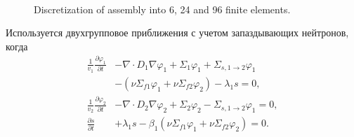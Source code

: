 \documentclass[authoryear]{elsarticle}
\begin{document}
\begin{figure}[!h]
\begin{center}
\begin{minipage}{0.30\linewidth}
\end{minipage}
\hfill
\begin{minipage}{0.30\linewidth}
\\
\end{minipage}
\caption{Discretization of assembly into 6, 24 and 96 finite elements.}
\label{fig:3}
  \end{center}
\end{figure}

Используется двухгрупповое приближения с учетом запаздывающих нейтронов, когда 
\begin{equation}\label{22}
\begin{split}
 \frac{1}{v_1}  \frac{\partial \varphi_1}{\partial t}  
 & - \nabla \cdot D_1 \nabla \varphi_1  + \Sigma_1 \varphi_1 + \Sigma_{s,1\rightarrow 2} \varphi_1  \\
 & - (\nu \Sigma_{f1} \varphi_1 + \nu \Sigma_{f2} \varphi_2) - \lambda_1 s = 0, \\
 \frac{1}{v_2}  \frac{\partial \varphi_2}{\partial t}  
 & - \nabla \cdot D_2 \nabla \varphi_2  + \Sigma_2 \varphi_2 - \Sigma_{s,1\rightarrow 2} \varphi_1   = 0,\\
 \frac{\partial s}{\partial t} & + \lambda_1 s - \beta_1(\nu \Sigma_{f1} \varphi_1 + \nu \Sigma_{f2} \varphi_2) = 0. 
\end{split}
\end{equation} 
\end{document}
